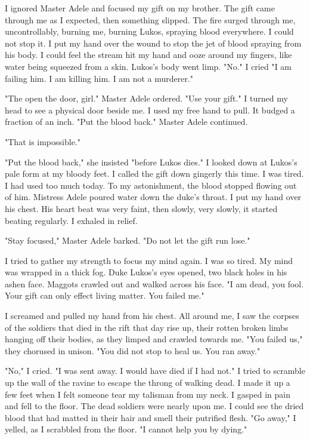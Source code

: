 \documentclass{article}
\begin{document}
I ignored Master Adele and focused my gift on my brother. The gift came through me as I expected, then something slipped. The fire surged through me, uncontrollably, burning me, burning Lukos, spraying blood everywhere. I could not stop it. I put my hand over the wound to stop the jet of blood spraying from his body. I could feel the stream hit my hand and ooze around my fingers, like water being squeezed from a skin. Lukos's body went limp. "No." I cried "I am failing him. I am killing him. I am not a murderer."

"The open the door, girl." Master Adele ordered. "Use your gift." I turned my head to see a physical door beside me. I used my free hand to pull. It budged a fraction of an inch. "Put the blood back." Master Adele continued. 

"That is impossible." 

"Put the blood back," she insisted "before Lukos dies." I looked down at Lukos's pale form at my bloody feet. I called the gift down gingerly this time. I was tired. I had used too much today. To my astonishment, the blood stopped flowing out of him. Mistress Adele poured water down the duke's throat. I put my hand over his chest. His heart beat was very faint, then slowly, very slowly, it started beating regularly. I exhaled in relief. 

"Stay focused," Master Adele barked. "Do not let the gift run lose." 

I tried to gather my strength to focus my mind again. I was so tired. My mind was wrapped in a thick fog. Duke Lukos's eyes opened, two black holes in his ashen face. Maggots crawled out and walked across his face. "I am dead, you fool. Your gift can only effect living matter. You failed me." 

I screamed and pulled my hand from his chest. All around me, I saw the corpses of the soldiers that died in the rift that day rise up, their rotten broken limbs hanging off their bodies, as they limped and crawled towards me. "You failed us," they chorused in unison. "You did not stop to heal us. You ran away."

"No," I cried. "I was sent away. I would have died if I had not." I tried to scramble up the wall of the ravine to escape the throng of walking dead. I made it up a few feet when I felt someone tear my talisman from my neck. I gasped in pain and fell to the floor. The dead soldiers were nearly upon me. I could see the dried blood that had matted in their hair and smell their putrified flesh. "Go away," I yelled, as I scrabbled from the floor. "I cannot help you by dying." 
\end{document}
